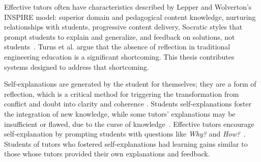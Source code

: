 Effective tutors often have characteristics described by Lepper and Wolverton's INSPIRE model: superior domain and pedagogical content knowledge, nurturing relationships with students, progressive content delivery, Socratic styles that prompt students to explain and generalize, and feedback on solutions, not students~\cite{wood2012role}. Turns et al. \cite{asee} argue that the absence of reflection in traditional engineering education is a significant shortcoming. This thesis contributes systems designed to address that shortcoming.

Self-explanations are generated by the student for themselves; they are a form of reflection, which is a critical method for triggering the transformation from conflict and doubt into clarity and coherence \cite{dewey1933}. Students self-explanations foster the integration of new knowledge, while some tutors' explanations may be insufficient or flawed, due to the curse of knowledge~\cite{birch2007curse}. Effective tutors encourage self-explanation by prompting students with questions like {\it Why?} and {\it How?}~\cite{selfexplanation}. Students of tutors who fostered self-explanations had learning gains similar to those whose tutors provided their own explanations and feedback\cite{chi2001learning}. 




\begin{comment}
Turns et al. \cite{asee} argue that the absence of reflection in traditional engineering education is a significant shortcoming.
\end{comment}



